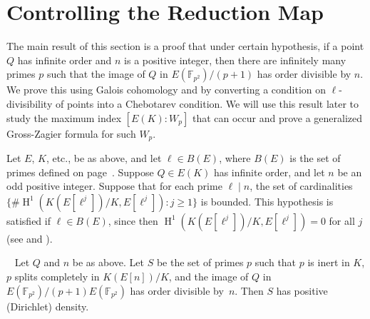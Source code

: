 \documentclass{oupau}
\DeclareMathOperator{\HH}{H}
\renewcommand{\H}{\HH}
\newcommand{\FF}{\mathbb{F}}
\begin{document}
\section{Controlling the Reduction Map}\label{sec:reduction}
The main result of this section is a proof that under certain
hypothesis, if a point $Q$ has infinite order and $n$ is a positive
integer, then there are infinitely many primes $p$ such that the image
of $Q$ in $E(\FF_{p^2})/(p+1)$ has order divisible by $n$.  We prove
this using Galois cohomology and by converting a condition on
$\ell$-divisibility of points into a Chebotarev condition.  We will
use this result later to study the maximum index $[E(K):W_p]$ that can
occur and prove a generalized Gross-Zagier formula for such $W_p$.

Let $E$, $K$, etc., be as above, and let $\ell\in B(E)$, where $B(E)$ is
the set of primes defined on page~\pageref{defn:be}.
Suppose $Q\in E(K)$ has infinite order, and let $n$ be an odd positive integer. 
Suppose that for each prime $\ell\mid n$, the set of cardinalities
$\{\#\H^1(K(E[\ell^j])/K,E[\ell^j]) : j \geq 1\}$ is bounded.   This
hypothesis is satisfied if $\ell\in B(E)$, since then
$\H^1(K(E[\ell^j])/K,E[\ell^j]) = 0$ for all $j$
(see \cite[pg.~241]{gross:kolyvagin} and \cite[Prop.~5.2]{bsdalg1}). 
\begin{proposition}~\label{prop:bigord}
Let $Q$ and $n$ be as above. 
Let $S$ be the set of primes $p$ such that $p$
is inert in $K$, $p$ splits completely in $K(E[n])/K$, 
and the image of $Q$ in $E(\FF_{p^2})/(p+1)E(\FF_{p^2})$  has order divisible by~$n$.
Then $S$ has positive (Dirichlet) density.
\end{proposition}
\end{document}
